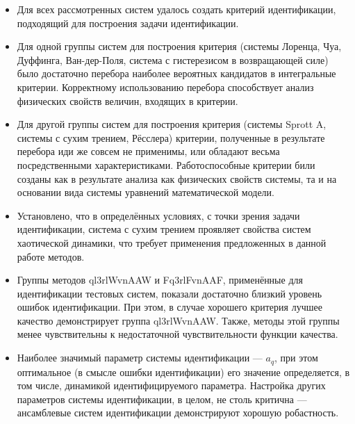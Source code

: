 \begin{itemize}

  \item
    Для всех рассмотренных систем удалось создать критерий идентификации,
    подходящий для построения задачи идентификации.

  \item
    Для одной группы систем для построения критерия
    (системы Лоренца, Чуа, Дуффинга, Ван-дер-Поля, система с гистерезисом в возвращающей силе)
    было достаточно
    перебора наиболее вероятных кандидатов в интегральные критерии.
    Корректному использованию перебора способствует анализ
    физических свойств величин, входящих в критерии.

  \item
    Для другой группы систем для построения критерия
    (системы Sprott A, системы с сухим трением, Рёсслера)
    критерии, полученные в результате перебора
    иди же совсем не применимы, или обладают весьма посредственными характеристиками.
    Работоспособные критерии били созданы как в результате
    анализа как физических свойств системы, та и на основании
    вида системы уравнений математической модели.


  \item
    Установлено, что в определённых условиях, с точки зрения задачи идентификации,
    система с сухим трением проявляет свойства систем хаотической динамики,
    что требует применения предложенных в данной работе методов.


  \item
    Группы методов ql3rlWvnAAW и Fq3rlFvnAAF, применённые для идентификации
    тестовых систем, показали достаточно близкий уровень ошибок идентификации.
    При этом, в случае хорошего критерия лучшее качество демонстрирует группа ql3rlWvnAAW.
    Также, методы этой группы менее чувствительны к недостаточной чувствительности функции качества.

  \item
    Наиболее значимый параметр системы идентификации --- $a_q$,
    при этом оптимальное (в смысле ошибки идентификации) его значение
    определяется, в том числе, динамикой идентифицируемого параметра.
    Настройка других параметров системы идентификации, в целом,
    не столь критична --- ансамблевые систем идентификации
    демонстрируют хорошую робастность.


\end{itemize}







